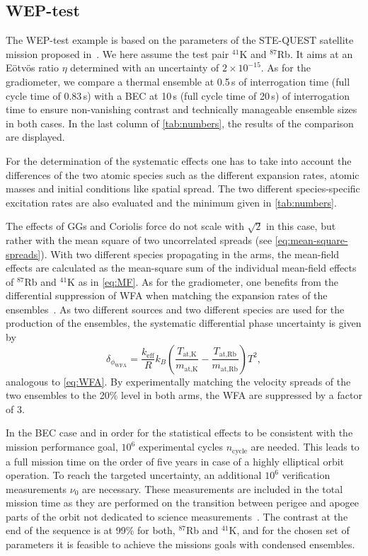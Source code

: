 \subsection{WEP-test}\label{sec:WEP-test}
The WEP-test example is based on the parameters of the STE-QUEST satellite mission proposed in~\cite{Aguilera2014}. We here assume the test pair $^{41}$K and $^{87}$Rb. It aims at an Eötvös ratio $\eta$ determined with an uncertainty of $2\times10^{-15}$. As for the gradiometer, we compare a thermal ensemble at 0.5\,s of interrogation time (full cycle time of 0.83\,s) with a BEC at 10\,s (full cycle time of 20\,s) of interrogation time to ensure non-vanishing contrast and technically manageable ensemble sizes in both cases. In the last column of \autoref{tab:numbers}, the results of the comparison are displayed.

For the determination of the systematic effects one has to take into account the differences of the two atomic species such as the different expansion rates, atomic masses and initial conditions like spatial spread. The two different species-specific excitation rates are also evaluated and the minimum given in \autoref{tab:numbers}.

The effects of GGs and Coriolis force do not scale with $\sqrt{2}$ in this case, but rather with the mean square of two uncorrelated spreads (see \autoref{eq:mean-square-spreads}).
With two different species propagating in the arms, the mean-field effects are calculated as the mean-square sum of the individual mean-field effects of $^{87}$Rb and $^{41}$K as in \autoref{eq:MF}.
As for the gradiometer, one benefits from the differential suppression of WFA when matching the expansion rates of the ensembles~\cite{Aguilera2014}. As two different sources and two different species are used for the production of the ensembles, the systematic differential phase uncertainty is given by
\begin{equation}
    \delta_{\phi_\text{WFA}}= \frac{k_\text{eff}}{R} k_B \left(\frac{T_\text{at,K}}{m_\text{at,K}}-\frac{T_\text{at,Rb}}{m_\text{at,Rb}}\right)T^2,
\end{equation}
analogous to \autoref{eq:WFA}. 
By experimentally matching the velocity spreads of the two ensembles to the 20\% level in both arms, the WFA are suppressed by a factor of 3.

In the BEC case and in order for the statistical effects to be consistent with the mission performance goal, $10^6$ experimental cycles $n_\text{cycle}$ are needed. This leads to a full mission time on the order of five years in case of a highly elliptical orbit operation.
To reach the targeted uncertainty, an additional $10^6$ verification measurements $\nu_0$ are necessary. These measurements are included in the total mission time as they are performed on the transition between perigee and apogee parts of the orbit not dedicated to science measurements~\cite{Aguilera2014}. The contrast at the end of the sequence is at 99\% for both, $^{87}$Rb and $^{41}$K, and for the chosen set of parameters it is feasible to achieve the missions goals with condensed ensembles.

